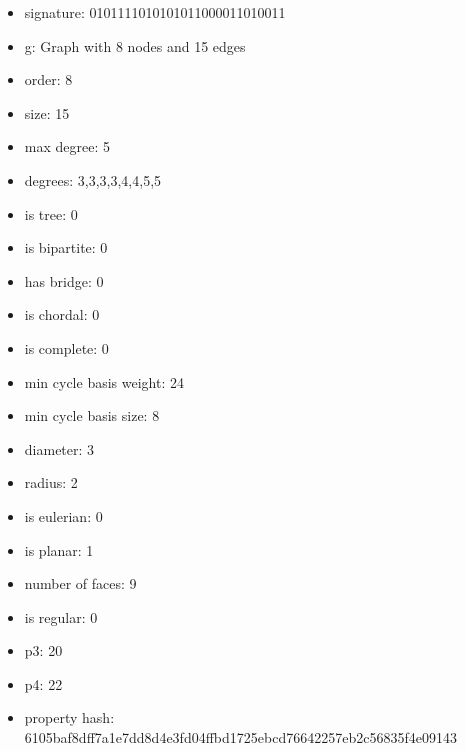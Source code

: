 \begin{itemize}
\item signature: 0101111010101011000011010011
\item g: Graph with 8 nodes and 15 edges
\item order: 8
\item size: 15
\item max degree: 5
\item degrees: 3,3,3,3,4,4,5,5
\item is tree: 0
\item is bipartite: 0
\item has bridge: 0
\item is chordal: 0
\item is complete: 0
\item min cycle basis weight: 24
\item min cycle basis size: 8
\item diameter: 3
\item radius: 2
\item is eulerian: 0
\item is planar: 1
\item number of faces: 9
\item is regular: 0
\item p3: 20
\item p4: 22
\item property hash: 6105baf8dff7a1e7dd8d4e3fd04ffbd1725ebcd76642257eb2c56835f4e09143
\end{itemize}
\newpage
\begin{figure}
\end{figure}
